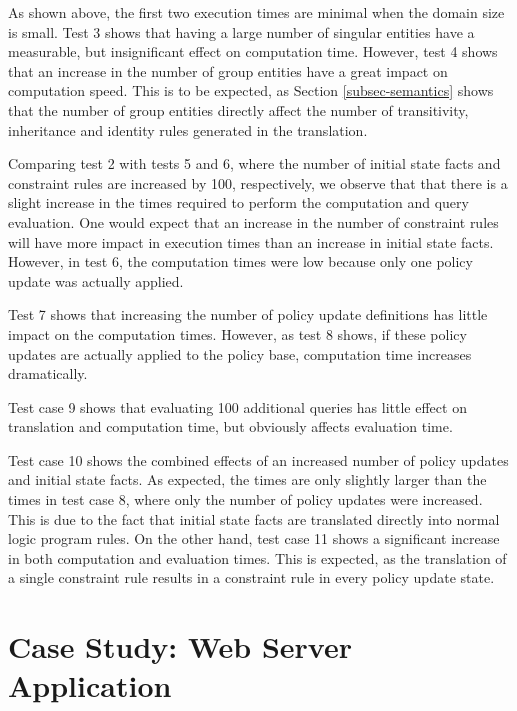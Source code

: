 \documentclass[global,twocolumn,final]{svjour}
\begin{document}
      As shown above, the first two execution times are minimal when the
      domain size is small. Test 3 shows that having a large number of singular
      entities have a measurable, but insignificant effect on computation time.
      However, test 4 shows that an increase in the number of group entities
      have a great impact on computation speed. This is to be expected, as
      Section \ref{subsec-semantics} shows that the number of group entities
      directly affect the number of transitivity, inheritance and identity
      rules generated in the translation.

      Comparing test 2 with tests 5 and 6, where the number of initial state
      facts and constraint rules are increased by 100, respectively, we observe
      that that there is a slight increase in the times required to perform the
      computation and query evaluation. One would expect that an increase in
      the number of constraint rules will have more impact in execution times
      than an increase in initial state facts. However, in test 6, the
      computation times were low because only one policy update was actually
      applied.

      Test 7 shows that increasing the number of policy update definitions
      has little impact on the computation times. However, as test 8 shows,
      if these policy updates are actually applied to the policy base,
      computation time increases dramatically.

      Test case 9 shows that evaluating 100 additional queries has little
      effect on translation and computation time, but obviously affects
      evaluation time.

      Test case 10 shows the combined effects of an increased number of policy
      updates and initial state facts. As expected, the times are only slightly
      larger than the times in test case 8, where only the number of policy
      updates were increased. This is due to the fact that initial state facts
      are translated directly into normal logic program rules. On the other
      hand, test case 11 shows a significant increase in both computation and
      evaluation times. This is expected, as the translation of a single
      constraint rule results in a constraint rule in every policy update
      state.

  \section{Case Study: Web Server Application}
    \label{sec-case}
\end{document}
